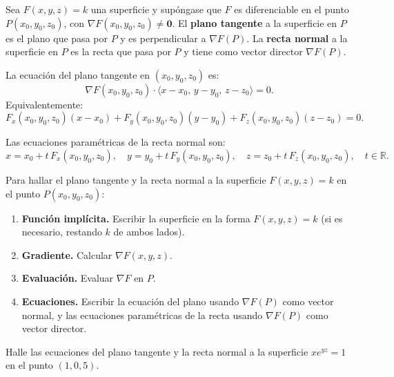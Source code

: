 \begin{definition}
Sea $F(x,y,z)=k$ una superficie y supóngase que $F$ es diferenciable en
el punto $P(x_0,y_0,z_0)$, con $\nabla F(x_0,y_0,z_0) \neq \mathbf{0}$.
El \textbf{plano tangente} a la superficie en $P$ es el plano que pasa
por $P$ y es perpendicular a $\nabla F(P)$. La \textbf{recta normal} a
la superficie en $P$ es la recta que pasa por $P$ y tiene como vector
director $\nabla F(P)$.
\end{definition}

La ecuación del plano tangente en $(x_0,y_0,z_0)$ es:
\[
\nabla F(x_0,y_0,z_0) \cdot \langle x-x_0,\, y-y_0,\, z-z_0 \rangle = 0.
\]
Equivalentemente:
\[
F_x(x_0,y_0,z_0)(x-x_0)
+ F_y(x_0,y_0,z_0)(y-y_0)
+ F_z(x_0,y_0,z_0)(z-z_0) = 0.
\]

Las ecuaciones paramétricas de la recta normal son:
\[
x = x_0 + t\,F_x(x_0,y_0,z_0),\quad
y = y_0 + t\,F_y(x_0,y_0,z_0),\quad
z = z_0 + t\,F_z(x_0,y_0,z_0),\quad t\in\mathbb{R}.
\]

\begin{pasos}
Para hallar el plano tangente y la recta normal a la superficie
$F(x,y,z)=k$ en el punto $P(x_0,y_0,z_0)$:
\begin{enumerate}
    \item \textbf{Función implícita.} Escribir la superficie en la forma
    $F(x,y,z)=k$ (si es necesario, restando $k$ de ambos lados).
    \item \textbf{Gradiente.} Calcular $\nabla F(x,y,z)$.
    \item \textbf{Evaluación.} Evaluar $\nabla F$ en $P$.
    \item \textbf{Ecuaciones.} Escribir la ecuación del plano usando
    $\nabla F(P)$ como vector normal, y las ecuaciones paramétricas de la
    recta usando $\nabla F(P)$ como vector director.
\end{enumerate}
\end{pasos}

\begin{example}
Halle las ecuaciones del plano tangente y la recta normal a la superficie
$x e^{yz} = 1$ en el punto $(1,0,5)$.
\end{example}

